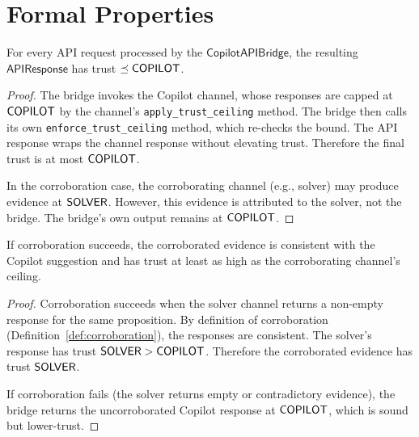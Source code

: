 \documentclass[11pt]{article}
\newcommand{\Bridge}{\mathsf{CopilotAPIBridge}}
\newcommand{\APIResp}{\mathsf{APIResponse}}
\begin{document}
\section{Formal Properties}\label{sec:formal}

\begin{theorem}\label{thm:trustceil}
For every API request processed by the $\Bridge$, the
resulting $\APIResp$ has trust $\preceq \mathsf{COPILOT}$.
\end{theorem}
\begin{proof}
The bridge invokes the Copilot channel, whose responses
are capped at $\mathsf{COPILOT}$ by the channel's
\texttt{apply\_trust\_ceiling} method.  The bridge then
calls its own \texttt{enforce\_trust\_ceiling} method,
which re-checks the bound.  The API response wraps the
channel response without elevating trust.  Therefore the
final trust is at most $\mathsf{COPILOT}$.

In the corroboration case, the corroborating channel (e.g.,
solver) may produce evidence at $\mathsf{SOLVER}$.  However, this
evidence is attributed to the solver, not the bridge.  The
bridge's own output remains at $\mathsf{COPILOT}$.
\end{proof}

\begin{theorem}\label{thm:corrobsound}
If corroboration succeeds, the corroborated evidence is
consistent with the Copilot suggestion and has trust at
least as high as the corroborating channel's ceiling.
\end{theorem}
\begin{proof}
Corroboration succeeds when the solver channel returns a
non-empty response for the same proposition.  By definition
of corroboration (Definition~\ref{def:corroboration}), the
responses are consistent.  The solver's response has trust
$\mathsf{SOLVER} > \mathsf{COPILOT}$.  Therefore the corroborated evidence
has trust $\mathsf{SOLVER}$.

If corroboration fails (the solver returns empty or
contradictory evidence), the bridge returns the
uncorroborated Copilot response at $\mathsf{COPILOT}$, which
is sound but lower-trust.
\end{proof}
\end{document}
